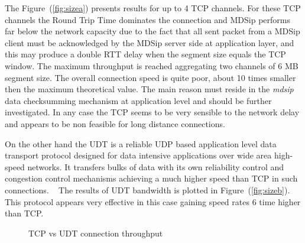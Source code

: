 \documentclass[10pt,a4paper]{article}
\begin{document}
The Figure~(\ref{fig:sizea}) presents results for up to 4 TCP channels. 
For these TCP channels the Round Trip Time dominates the connection and MDSip performs far below the network capacity due to the fact that all sent packet from a MDSip client must be acknowledged by the MDSip server side at application layer, and this may produce a double RTT delay when the segment size equals the TCP window.
The maximum throughput is reached aggregating two channels of 6 MB segment size.
The overall connection speed is quite poor, about 10 times smaller then the maximum theoretical value.
The main reason must reside in the \emph{mdsip} data checksumming mechanism at application level and should be further investigated.
In any case the TCP seems to be very sensible to the network delay and appears to be non feasible for long distance connections.

On the other hand the UDT is a reliable UDP based application level data transport protocol designed for data intensive applications over wide area high-speed networks. 
It transfers bulks of data with its own reliability control and congestion control mechanisms achieving a much higher speed than TCP in such connections.
~
The results of UDT bandwidth is plotted in Figure~(\ref{fig:sizeb}).
This protocol appears very effective in this case gaining speed rates 6 time higher than TCP.

\begin{figure}[ht]
\centerline{
}
\caption[]
{ TCP vs UDT connection throughput }
\label{fig:size}
\end{figure}
\end{document}
